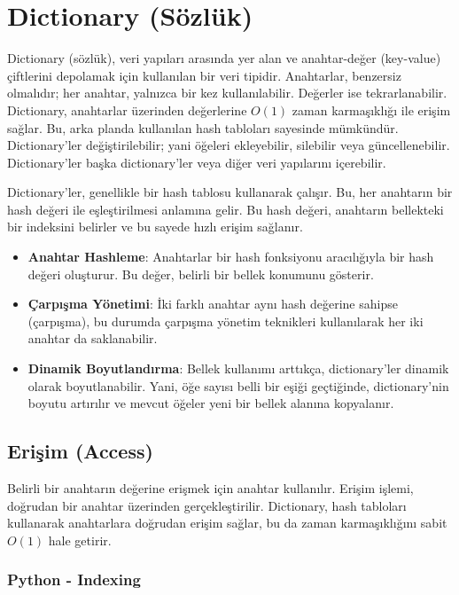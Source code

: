 \section{Dictionary (Sözlük)}

Dictionary (sözlük), veri yapıları arasında yer alan ve anahtar-değer (key-value) çiftlerini depolamak için kullanılan bir veri tipidir.  Anahtarlar, benzersiz olmalıdır; her anahtar, yalnızca bir kez kullanılabilir. Değerler ise tekrarlanabilir. Dictionary, anahtarlar üzerinden değerlerine $O(1)$ zaman karmaşıklığı ile erişim sağlar. Bu, arka planda kullanılan hash tabloları sayesinde mümkündür. Dictionary'ler değiştirilebilir; yani öğeleri ekleyebilir, silebilir veya güncellenebilir. Dictionary'ler başka dictionary'ler veya diğer veri yapılarını içerebilir.

Dictionary'ler, genellikle bir hash tablosu kullanarak çalışır. Bu, her anahtarın bir hash değeri ile eşleştirilmesi anlamına gelir. Bu hash değeri, anahtarın bellekteki bir indeksini belirler ve bu sayede hızlı erişim sağlanır.

\begin{itemize}
    \item \textbf{Anahtar Hashleme}: Anahtarlar bir hash fonksiyonu aracılığıyla bir hash değeri oluşturur. Bu değer, belirli bir bellek konumunu gösterir.
    \item \textbf{Çarpışma Yönetimi}: İki farklı anahtar aynı hash değerine sahipse (çarpışma), bu durumda çarpışma yönetim teknikleri kullanılarak her iki anahtar da saklanabilir.
    \item \textbf{Dinamik Boyutlandırma}: Bellek kullanımı arttıkça, dictionary'ler dinamik olarak boyutlanabilir. Yani, öğe sayısı belli bir eşiği geçtiğinde, dictionary'nin boyutu artırılır ve mevcut öğeler yeni bir bellek alanına kopyalanır.
\end{itemize}

\subsection{Erişim (Access)}

Belirli bir anahtarın değerine erişmek için anahtar kullanılır. Erişim işlemi, doğrudan bir anahtar üzerinden gerçekleştirilir. Dictionary, hash tabloları kullanarak anahtarlara doğrudan erişim sağlar, bu da zaman karmaşıklığını sabit $O(1)$ hale getirir.

\subsubsection{Python - Indexing}

